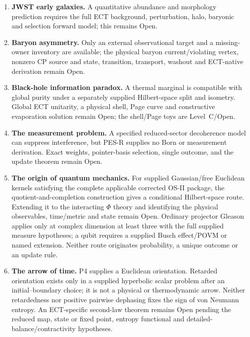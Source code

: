 \documentclass[11pt,a4paper]{article}
\begin{document}
\begin{enumerate}
\item \textbf{JWST early galaxies.} A quantitative abundance and morphology prediction requires the full ECT background, perturbation, halo, baryonic and selection forward model; this remains Open.

\item \textbf{Baryon asymmetry.} Only an external observational target and a
missing-owner inventory are available; the physical baryon current/violating
vertex, nonzero CP source and state, transition, transport, washout and
ECT-native derivation remain Open.

\item \textbf{Black-hole information paradox.} A thermal marginal is compatible with global purity under a separately supplied Hilbert-space split and isometry.  Global ECT unitarity, a physical shell, Page curve and constructive evaporation solution remain Open; the shell/Page toys are Level~C/Open.

\item \textbf{The measurement problem.} A specified reduced-sector decoherence model can suppress interference, but PES-R supplies no Born or measurement derivation. Exact weights, pointer-basis selection, single outcome, and the update theorem remain Open.

\item \textbf{The origin of quantum mechanics.} For supplied Gaussian/free Euclidean kernels satisfying the complete applicable corrected OS-II package, the quotient-and-completion construction gives a conditional Hilbert-space route.  Extending it to the interacting $\Phi$ theory and identifying the physical observables, time/metric and state remain Open.  Ordinary projector Gleason applies only at complex dimension at least three with the full supplied measure hypotheses; a qubit requires a supplied Busch effect/POVM or named extension.  Neither route originates probability, a unique outcome or an update rule.

\item \textbf{The arrow of time.} P4 supplies a Euclidean orientation.  Retarded orientation exists only in a supplied hyperbolic scalar problem after an initial--boundary choice; it is not a physical or thermodynamic arrow.  Neither retardedness nor positive pairwise dephasing fixes the sign of von Neumann entropy.  An ECT-specific second-law theorem remains Open pending the reduced map, state or fixed point, entropy functional and detailed-balance/contractivity hypotheses.


\end{enumerate}
\end{document}
